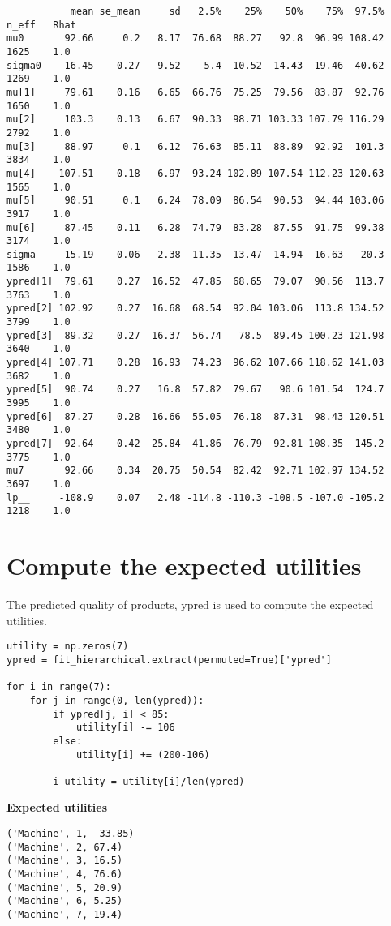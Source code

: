 \documentclass{article}
\begin{document}
\begin{verbatim}
           mean se_mean     sd   2.5%    25%    50%    75%  97.5%  n_eff   Rhat
mu0       92.66     0.2   8.17  76.68  88.27   92.8  96.99 108.42   1625    1.0
sigma0    16.45    0.27   9.52    5.4  10.52  14.43  19.46  40.62   1269    1.0
mu[1]     79.61    0.16   6.65  66.76  75.25  79.56  83.87  92.76   1650    1.0
mu[2]     103.3    0.13   6.67  90.33  98.71 103.33 107.79 116.29   2792    1.0
mu[3]     88.97     0.1   6.12  76.63  85.11  88.89  92.92  101.3   3834    1.0
mu[4]    107.51    0.18   6.97  93.24 102.89 107.54 112.23 120.63   1565    1.0
mu[5]     90.51     0.1   6.24  78.09  86.54  90.53  94.44 103.06   3917    1.0
mu[6]     87.45    0.11   6.28  74.79  83.28  87.55  91.75  99.38   3174    1.0
sigma     15.19    0.06   2.38  11.35  13.47  14.94  16.63   20.3   1586    1.0
ypred[1]  79.61    0.27  16.52  47.85  68.65  79.07  90.56  113.7   3763    1.0
ypred[2] 102.92    0.27  16.68  68.54  92.04 103.06  113.8 134.52   3799    1.0
ypred[3]  89.32    0.27  16.37  56.74   78.5  89.45 100.23 121.98   3640    1.0
ypred[4] 107.71    0.28  16.93  74.23  96.62 107.66 118.62 141.03   3682    1.0
ypred[5]  90.74    0.27   16.8  57.82  79.67   90.6 101.54  124.7   3995    1.0
ypred[6]  87.27    0.28  16.66  55.05  76.18  87.31  98.43 120.51   3480    1.0
ypred[7]  92.64    0.42  25.84  41.86  76.79  92.81 108.35  145.2   3775    1.0
mu7       92.66    0.34  20.75  50.54  82.42  92.71 102.97 134.52   3697    1.0
lp__     -108.9    0.07   2.48 -114.8 -110.3 -108.5 -107.0 -105.2   1218    1.0
\end{verbatim}

\section{Compute the expected utilities}
The predicted quality of products, ypred is used to compute the expected utilities.
\begin{verbatim}
utility = np.zeros(7)
ypred = fit_hierarchical.extract(permuted=True)['ypred']

for i in range(7):
    for j in range(0, len(ypred)):
        if ypred[j, i] < 85:
            utility[i] -= 106
        else:
            utility[i] += (200-106)

        i_utility = utility[i]/len(ypred)
\end{verbatim}

\textbf{Expected utilities}
\begin{verbatim}
('Machine', 1, -33.85)
('Machine', 2, 67.4)
('Machine', 3, 16.5)
('Machine', 4, 76.6)
('Machine', 5, 20.9)
('Machine', 6, 5.25)
('Machine', 7, 19.4)
\end{verbatim}
\end{document}

